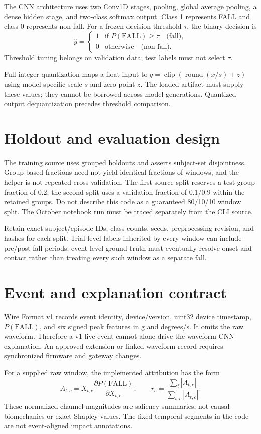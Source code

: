 The CNN architecture uses two Conv1D stages, pooling, global average pooling, a dense hidden stage, and two-class softmax output. Class 1 represents FALL and class 0 represents non-fall. For a frozen decision threshold $\tau$, the binary decision is
\[
\hat y=\begin{cases}
1 & \text{if }P(\mathrm{FALL})\ge\tau \quad\text{(fall)},\\
0 & \text{otherwise} \quad\text{(non-fall)}.
\end{cases}
\] Threshold tuning belongs on validation data; test labels must not select $\tau$.

Full-integer quantization maps a float input to $q=\operatorname{clip}(\operatorname{round}(x/s)+z)$ using model-specific scale $s$ and zero point $z$. The loaded artifact must supply these values; they cannot be borrowed across model generations. Quantized output dequantization precedes threshold comparison.

\section{Holdout and evaluation design}
The training source uses grouped holdouts and asserts subject-set disjointness. Group-based fractions need not yield identical fractions of windows, and the helper is not repeated cross-validation. The first source split reserves a test group fraction of 0.2; the second split uses a validation fraction of $0.1/0.9$ within the retained groups. Do not describe this code as a guaranteed 80/10/10 window split. The October notebook run must be traced separately from the CLI source.

Retain exact subject/episode IDs, class counts, seeds, preprocessing revision, and hashes for each split. Trial-level labels inherited by every window can include pre/post-fall periods; event-level ground truth must eventually resolve onset and contact rather than treating every such window as a separate fall.

\section{Event and explanation contract}
Wire Format v1 records event identity, device/version, uint32 device timestamp, $P(\mathrm{FALL})$, and six signed peak features in g and degrees/s. It omits the raw waveform. Therefore a v1 live event cannot alone drive the waveform CNN explanation. An approved extension or linked waveform record requires synchronized firmware and gateway changes.

For a supplied raw window, the implemented attribution has the form
\[
 A_{t,c}=X_{t,c}\frac{\partial P(\mathrm{FALL})}{\partial X_{t,c}},\qquad
 r_c=\frac{\sum_t |A_{t,c}|}{\sum_{t,c}|A_{t,c}|}.
\]
These normalized channel magnitudes are saliency summaries, not causal biomechanics or exact Shapley values. The fixed temporal segments in the code are not event-aligned impact annotations.


